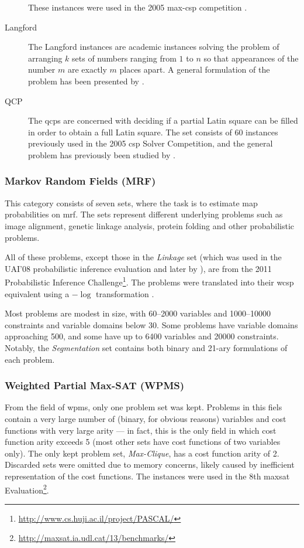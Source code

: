 \begin{description}
		These instances were used in the 2005 max-\gls{csp} competition \parencite{Boussemart05}.
	\item[Langford]
		The Langford instances are academic instances solving the problem of arranging \(k\) sets of numbers ranging from \(1\) to \(n\) so that appearances of the number \(m\) are exactly \(m\) places apart.
		A general formulation of the problem has been presented by \textcite{Linek03}.
	\item[QCP]
		The \glspl{qcp} are concerned with deciding if a partial Latin square can be filled in order to obtain a full Latin square.
		The set consists of 60 instances previously used in the 2005 \gls{csp} Solver Competition, and the general problem has previously been studied by \textcite{Gomes02}.
\end{description}

\subsubsection{Markov Random Fields (MRF)}
This category consists of seven sets, where the task is to estimate \gls{map} probabilities on \gls{mrf}. The sets represent different underlying problems such as image alignment, genetic linkage analysis, protein folding and other probabilistic problems.

All of these problems, except those in the \emph{Linkage} set (which was used in the UAI'08 probabilistic inference evaluation and later by \textcites{Favier11}{Kishimoto13}), are from the 2011 Probabilistic Inference Challenge\footnote{\url{http://www.cs.huji.ac.il/project/PASCAL/}}.
The problems were translated into their \gls{wcsp} equivalent using a \(-\log{}\) transformation \parencite[\pno~4]{deGivry14}.

Most problems are modest in size, with \numrange{60}{2000} variables and \numrange{1000}{10000} constraints and variable domains below \num{30}. 
Some problems have variable domains approaching \num{500}, and some have up to \num{6400} variables and \num{20000} constraints.
Notably, the \emph{Segmentation} set contains both binary and 21-ary formulations of each problem.

\subsubsection{Weighted Partial Max-SAT (WPMS)}
From the field of \gls{wpms}, only one problem set was kept.
Problems in this fiels contain a very large number of (binary, for obvious reasons) variables and cost functions with very large arity --- in fact, this is the only field in which cost function arity exceeds \num{5} (most other sets have cost functions of two variables only).
The only kept problem set, \emph{Max-Clique}, has a cost function arity of \num{2}.
Discarded sets were omitted due to memory concerns, likely caused by inefficient representation of the cost functions.
The instances were used in the 8th \Gls{maxsat} Evaluation\footnote{\url{http://maxsat.ia.udl.cat/13/benchmarks/}}.

